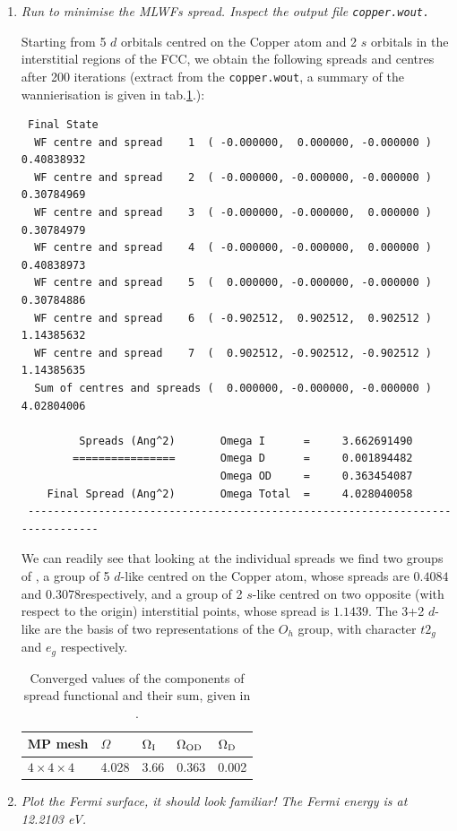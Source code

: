 \begin{enumerate}
	\item {\it Run \Wannier{} to minimise the MLWFs spread. Inspect the output file {\tt copper.wout.}}
	
	Starting from 5 $d$ orbitals centred on the Copper atom and 2 $s$ orbitals in the interstitial regions of the FCC, we obtain the following spreads and centres after 200 iterations (extract from the {\tt copper.wout}, a summary of the wannierisation is given in tab.\ref{tab4.1}.):
	\begin{tcolorbox}[sharp corners,boxrule=0.5pt]
	{\small
	\begin{verbatim}
 Final State
  WF centre and spread    1  ( -0.000000,  0.000000, -0.000000 )     0.40838932
  WF centre and spread    2  ( -0.000000, -0.000000, -0.000000 )     0.30784969
  WF centre and spread    3  ( -0.000000, -0.000000,  0.000000 )     0.30784979
  WF centre and spread    4  ( -0.000000, -0.000000,  0.000000 )     0.40838973
  WF centre and spread    5  (  0.000000, -0.000000, -0.000000 )     0.30784886
  WF centre and spread    6  ( -0.902512,  0.902512,  0.902512 )     1.14385632
  WF centre and spread    7  (  0.902512, -0.902512, -0.902512 )     1.14385635
  Sum of centres and spreads (  0.000000, -0.000000, -0.000000 )     4.02804006
 
         Spreads (Ang^2)       Omega I      =     3.662691490
        ================       Omega D      =     0.001894482
                               Omega OD     =     0.363454087
    Final Spread (Ang^2)       Omega Total  =     4.028040058
 ------------------------------------------------------------------------------
	\end{verbatim}
	}
	\end{tcolorbox}
	We can readily see that looking at the individual spreads we find two groups of \MLWFs, a group of 5 $d$-like \MLWFs{} centred on the Copper atom, whose spreads are $0.4084$\angsqd and $0.3078$\angsqd respectively, and a group of 2 $s$-like \MLWFs{} centred on two opposite (with respect to the origin) interstitial points, whose spread is $1.1439$\angsqd. The 3+2 $d$-like \MLWFs{} are the basis of two representations of the $O_h$ group, with character $t2_g$ and $e_g$ respectively.   
	\begin{table}[b!]
	\centering
	\caption{Converged values of the components of spread functional and their sum, given in \angsqd{}.}
	\begin{tabular}{@{} lllll @{}}\toprule[1.5pt]
	MP mesh & $\Omega$ & $\Omega\tinysub{I}$ & $\Omega\tinysub{OD}$ & $\Omega\tinysub{D}$ \\\midrule
	$4\times4\times4$ & 4.028 & 3.66 & 0.363 & 0.002 \\\bottomrule[1pt]
	\end{tabular}\label{tab4.1}
	\end{table}
	\item {\it Plot the Fermi surface, it should look familiar! The Fermi energy is at 12.2103 eV.}


\end{enumerate}
